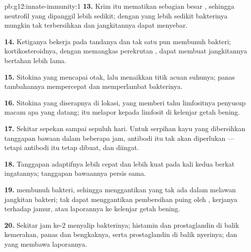 \begin{solution}{pb:g12:innate-immunity:1}
\textbf{13.} Krim itu mematikan sebagian besar , sehingga
neutrofil yang dipanggil lebih sedikit; dengan  yang lebih
sedikit bakterinya mungkin tak terbersihkan dan jangkitannya dapat
menyebar.

\textbf{14.} Ketiganya bekerja pada tandanya dan tak satu pun membunuh
bakteri; kortikosteroidnya, dengan memangkas perekrutan , dapat
membuat jangkitannya bertahan lebih lama.

\textbf{15.} Sitokina yang mencapai otak, lalu menaikkan titik acuan
suhunya; panas tambahannya mempercepat  dan memperlambat
bakterinya.

\textbf{16.} Sitokina yang diserapnya di lokasi, yang memberi tahu
limfositnya penyusup macam apa yang datang;  itu melapor kepada
limfosit di kelenjar getah bening.

\textbf{17.} Sekitar sepekan sampai sepuluh hari. Untuk serpihan kayu
yang dibersihkan tanggapan bawaan dalam beberapa jam, antibodi itu tak
akan diperlukan --- tetapi antibodi itu tetap dibuat, dan diingat.

\textbf{18.} Tanggapan adaptifnya lebih cepat dan lebih kuat pada kali
kedua berkat ingatannya; tanggapan bawaannya persis sama.

\textbf{19.}  membunuh bakteri, sehingga menggantikan 
yang tak ada dalam melawan jangkitan bakteri;  tak dapat
menggantikan pembersihan puing oleh , kerjanya terhadap jamur,
atau laporannya ke kelenjar getah bening.

\textbf{20.} Sekitar jam ke-2  menyalip bakterinya; histamin
dan prostaglandin di balik kemerahan, panas dan bengkaknya, serta
prostaglandin di balik nyerinya; dan  yang membawa
laporannya.
\end{solution}
